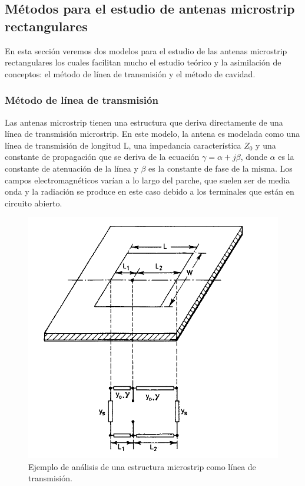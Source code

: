 \subsection{Métodos para el estudio de antenas microstrip rectangulares}\label{subsec:teoria}

En esta sección veremos dos modelos para el estudio de las antenas microstrip rectangulares los cuales facilitan mucho el estudio teórico y la asimilación de conceptos: el método de línea de transmisión y el método de cavidad.

\subsubsection{Método de línea de transmisión}

Las antenas microstrip tienen una estructura que deriva directamente de una línea de transmisión microstrip. En este modelo, la antena es modelada como una línea de transmisión de longitud L, una impedancia característica $Z_{0}$ y una constante de propagación que se deriva de la ecuación $\gamma = \alpha + j\beta$, donde $\alpha$ es la constante de atenuación de la línea y $\beta$ es la constante de fase de la misma. Los campos electromagnéticos varían a lo largo del parche, que suelen ser de media onda y la radiación se produce en este caso debido a los terminales que están en circuito abierto.\\

\begin{figure}[!htb]
    \centering
    \includegraphics[scale=0.25]{./ContextoTecnologico/ejemplo_linea}
    \caption{Ejemplo de análisis de una estructura microstrip como línea de transmisión.}
    \label{fig:fig2.8}
\end{figure}

